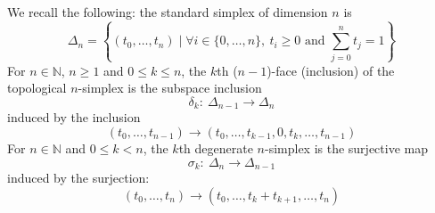 \documentclass[a4paper,fleqn]{cas-sc}
\def\N{\mathbb{N}}
\begin{document}

We recall the following: 
the standard simplex of dimension $n$ is $$
\Delta_n=\left\{(t_0,\ldots,t_n) \mid \forall i\in \{0,\ldots,n\}, \ t_i \geq 0 \mbox{ and } \sum\limits_{j=0}^n t_j=1\right\}
$$
For $n \in \N$, $n
\geq 1$ and $0 \leq k \leq n$, the $k$th ($n-1$)-face (inclusion) of the topological $n$-simplex is the subspace inclusion
$$\delta_k: \ \Delta_{n-1} \rightarrow \Delta_n$$
induced by the inclusion
$$(t_0,\ldots,t_{n-1}) \rightarrow (t_0,\ldots,t_{k-1},0,t_k,
\ldots, t_{n-1})$$
For $n \in \N$ and $0\leq k < n$, the 
$k$th degenerate 
$n$-simplex is the surjective map
$$
\sigma_k: \ \Delta_n \rightarrow \Delta_{n-1}$$
\noindent induced by the surjection: 
$$(t_0,\ldots,t_n)\rightarrow (t_0,\ldots,t_{k}+t_{k+1},\ldots,t_n)$$
\end{document}
